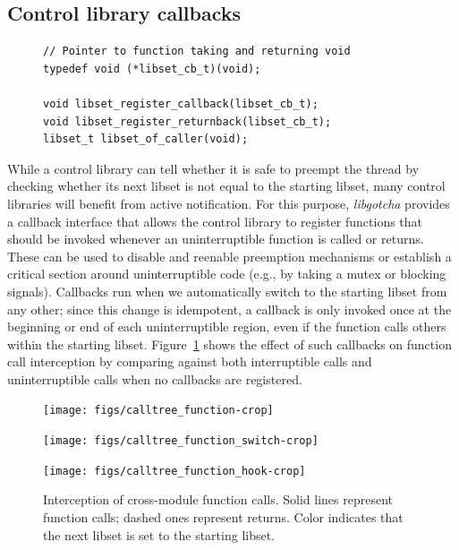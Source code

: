 \subsection{Control library callbacks}
\label{sec:libgotcha:callbacks}

\begin{figure}
\begin{lstlisting}[label=lst:gotchacbapi,caption=\textit{libgotcha} C callback interface]
// Pointer to function taking and returning void
typedef void (*libset_cb_t)(void);

void libset_register_callback(libset_cb_t);
void libset_register_returnback(libset_cb_t);
libset_t libset_of_caller(void);
\end{lstlisting}
\end{figure}

While a control library can tell whether it is safe to preempt the thread by checking
whether its next libset is not equal to the starting libset, many control libraries
will benefit from active notification.  For this purpose, \textit{libgotcha} provides
a callback interface that allows the control library to register functions that
should be invoked whenever an uninterruptible function is called or returns.  These
can be used to disable and reenable preemption mechanisms or establish a critical
section around uninterruptible code (e.g., by taking a mutex or blocking signals).
Callbacks run when we automatically switch to the starting libset from any other;
since this change is idempotent, a callback is only invoked once at the beginning or
end of each uninterruptible region, even if the function calls others within the
starting libset.  Figure~\ref{fig:gotchahooks} shows the effect of such callbacks on
function call interception by comparing against both interruptible calls and
uninterruptible calls when no callbacks are registered.

\begin{figure}
	\begin{minipage}{\textwidth}
	\texttt{[image: figs/calltree\_function-crop]}
	\end{minipage}

	\begin{minipage}{\textwidth}
	\texttt{[image: figs/calltree\_function\_switch-crop]}
	\end{minipage}

	\begin{minipage}{\textwidth}
	\texttt{[image: figs/calltree\_function\_hook-crop]}
	\end{minipage}
\caption[Interception of cross-module function calls]{
Interception of cross-module function calls. Solid lines represent function calls;
dashed ones represent returns. Color indicates that the next libset is set to the
starting libset.}
\label{fig:gotchahooks}
\end{figure}

